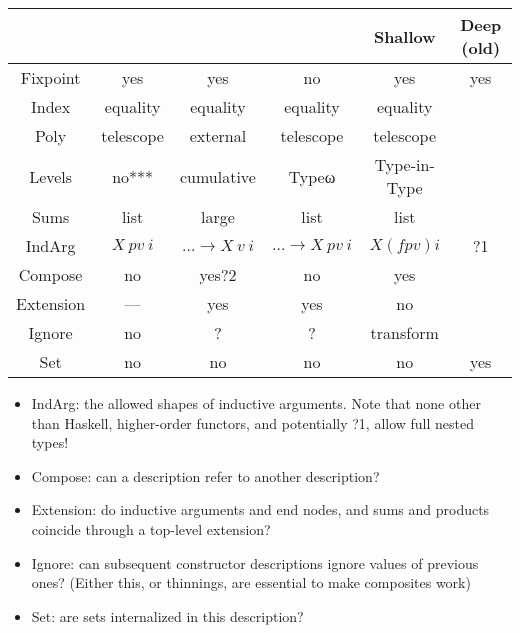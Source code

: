 \documentclass[10pt]{article}
\theoremstyle{plain}
\theoremstyle{definition}
\begin{document}
\begin{tabular}{c | c c c c c}
             & \cite{sijsling} & \cite{effectfully} & \cite{practgen} & Shallow   & Deep (old) \\
    \hline   
    Fixpoint & yes             & yes                & no              & yes       & yes     \\
    Index    & equality        & equality           & equality        & equality  &         \\
    Poly     & telescope       & external           & telescope       & telescope &         \\
    Levels   & no***           & cumulative         & Typeω           & Type-in-Type &         \\
    Sums     & list            & large              & list            & list      &         \\
    IndArg   & $X\ pv\ i$      & $\dots\to X\ v\ i$ & $\dots\to X\ pv\ i$ & $X (f pv) i$ & ?1 \\
    Compose  & no              & yes?2              & no              & yes       &         \\
    Extension& —               & yes                & yes             & no        &         \\
    Ignore   & no              & ?                  & ?               & transform &         \\
    Set      & no              & no                 & no              & no        & yes     \\
\end{tabular}





\begin{itemize}
    \item IndArg: the allowed shapes of inductive arguments. Note that none other than Haskell, higher-order functors, and potentially ?1, allow full nested types!
    \item Compose: can a description refer to another description?
    \item Extension: do inductive arguments and end nodes, and sums and products coincide through a top-level extension?
    \item Ignore: can subsequent constructor descriptions ignore values of previous ones? (Either this, or thinnings, are essential to make composites work)
    \item Set: are sets internalized in this description?
\end{itemize}
\end{document}
